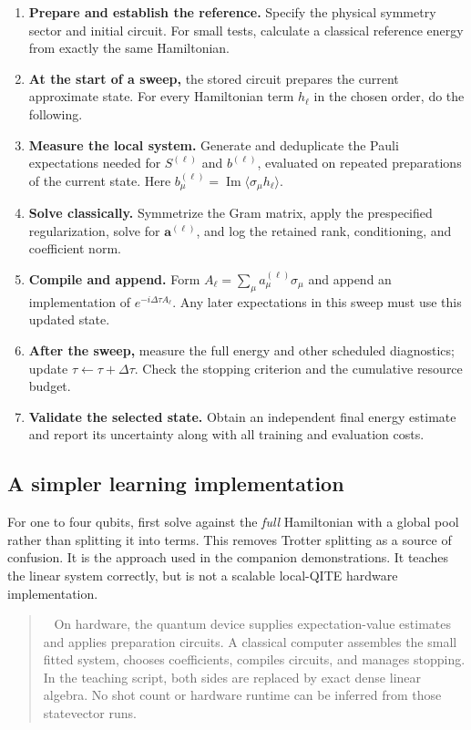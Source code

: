\documentclass[11pt,a4paper]{article}
\newcommand{\ex}[1]{\langle #1\rangle}
\newcommand{\Ima}{\operatorname{Im}}
\newcommand{\dt}{\Delta\tau}
\newenvironment{caution}[1][Important distinction]{\par\smallskip\begin{quotation}\noindent{\bfseries\textcolor{alertred}{#1.}}\ }{\end{quotation}\smallskip}
\begin{document}
\begin{enumerate}
\item \textbf{Prepare and establish the reference.} Specify the physical symmetry sector and initial circuit. For small tests, calculate a classical reference energy from exactly the same Hamiltonian.
\item \textbf{At the start of a sweep,} the stored circuit prepares the current approximate state. For every Hamiltonian term $h_\ell$ in the chosen order, do the following.
\item \textbf{Measure the local system.} Generate and deduplicate the Pauli expectations needed for $S^{(\ell)}$ and $b^{(\ell)}$, evaluated on repeated preparations of the current state. Here $b_\mu^{(\ell)}=\Ima\ex{\sigma_\mu h_\ell}$.
\item \textbf{Solve classically.} Symmetrize the Gram matrix, apply the prespecified regularization, solve for $\bm a^{(\ell)}$, and log the retained rank, conditioning, and coefficient norm.
\item \textbf{Compile and append.} Form $A_\ell=\sum_\mu a_\mu^{(\ell)}\sigma_\mu$ and append an implementation of $e^{-i\dt A_\ell}$. Any later expectations in this sweep must use this updated state.
\item \textbf{After the sweep,} measure the full energy and other scheduled diagnostics; update $\tau\leftarrow\tau+\dt$. Check the stopping criterion and the cumulative resource budget.
\item \textbf{Validate the selected state.} Obtain an independent final energy estimate and report its uncertainty along with all training and evaluation costs.
\end{enumerate}

\subsection*{A simpler learning implementation}
For one to four qubits, first solve against the \emph{full} Hamiltonian with a global pool rather than splitting it into terms. This removes Trotter splitting as a source of confusion. It is the approach used in the companion demonstrations. It teaches the linear system correctly, but is not a scalable local-QITE hardware implementation.

\begin{caution}[What is classical and what is quantum?]
On hardware, the quantum device supplies expectation-value estimates and applies preparation circuits. A classical computer assembles the small fitted system, chooses coefficients, compiles circuits, and manages stopping. In the teaching script, both sides are replaced by exact dense linear algebra. No shot count or hardware runtime can be inferred from those statevector runs.
\end{caution}
\end{document}
